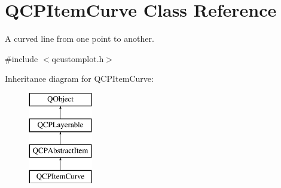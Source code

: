 \hypertarget{class_q_c_p_item_curve}{}\section{Q\+C\+P\+Item\+Curve Class Reference}
\label{class_q_c_p_item_curve}


A curved line from one point to another.  




{\ttfamily \#include $<$qcustomplot.\+h$>$}

Inheritance diagram for Q\+C\+P\+Item\+Curve\+:\begin{figure}[H]
\begin{center}
\leavevmode
\includegraphics[height=4.000000cm]{class_q_c_p_item_curve}
\end{center}
\end{figure}

